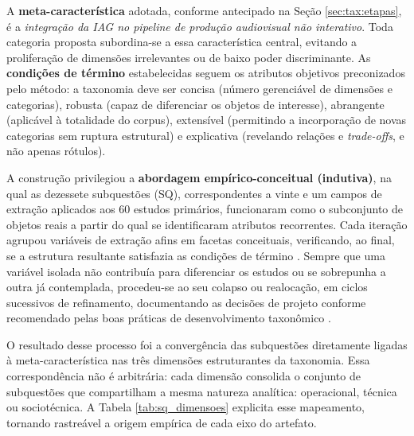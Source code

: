 A \textbf{meta-característica} adotada, conforme antecipado na Seção \ref{sec:tax:etapas}, é a \textit{integração da IAG no pipeline de produção audiovisual não interativo}. Toda categoria proposta subordina-se a essa característica central, evitando a proliferação de dimensões irrelevantes ou de baixo poder discriminante. As \textbf{condições de término} estabelecidas seguem os atributos objetivos preconizados pelo método: a taxonomia deve ser concisa (número gerenciável de dimensões e categorias), robusta (capaz de diferenciar os objetos de interesse), abrangente (aplicável à totalidade do corpus), extensível (permitindo a incorporação de novas categorias sem ruptura estrutural) e explicativa (revelando relações e \textit{trade-offs}, e não apenas rótulos).

A construção privilegiou a \textbf{abordagem empírico-conceitual (indutiva)}, na qual as dezessete subquestões (SQ), correspondentes a vinte e um campos de extração aplicados aos 60 estudos primários, funcionaram como o subconjunto de objetos reais a partir do qual se identificaram atributos recorrentes. Cada iteração agrupou variáveis de extração afins em facetas conceituais, verificando, ao final, se a estrutura resultante satisfazia as condições de término \citep{nickerson2013method, kundisch2022}. Sempre que uma variável isolada não contribuía para diferenciar os estudos ou se sobrepunha a outra já contemplada, procedeu-se ao seu colapso ou realocação, em ciclos sucessivos de refinamento, documentando as decisões de projeto conforme recomendado pelas boas práticas de desenvolvimento taxonômico \citep{szopinski2019}.

O resultado desse processo foi a convergência das subquestões diretamente ligadas à meta-característica nas três dimensões estruturantes da taxonomia. Essa correspondência não é arbitrária: cada dimensão consolida o conjunto de subquestões que compartilham a mesma natureza analítica: operacional, técnica ou sociotécnica. A Tabela \ref{tab:sq_dimensoes} explicita esse mapeamento, tornando rastreável a origem empírica de cada eixo do artefato.

